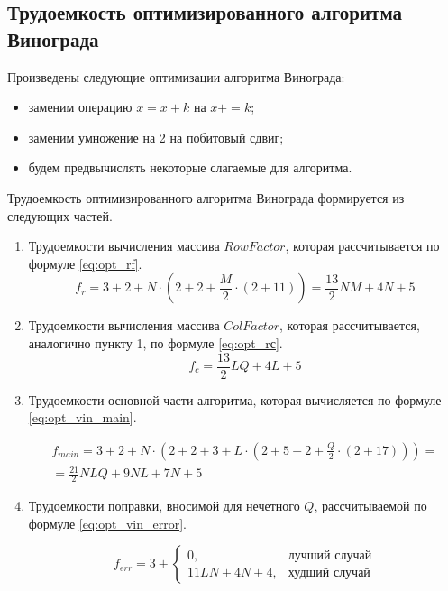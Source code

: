 \subsection{Трудоемкость оптимизированного алгоритма Винограда}

Произведены следующие оптимизации алгоритма Винограда:
\begin{itemize}
	\item заменим операцию $x = x + k$ на $x += k$;
	\item заменим умножение на 2 на побитовый сдвиг;
	\item будем предвычислять некоторые слагаемые для алгоритма.
\end{itemize}

Трудоемкость оптимизированного алгоритма Винограда формируется из следующих частей.
\begin{enumerate}
	\item Трудоемкости вычисления массива $RowFactor$, которая рассчитывается по формуле \eqref{eq:opt_rf}.
	\begin{equation}
		\label{eq:opt_rf}
		f_{r} = 3 + 2 + N \cdot (2 + 2 + \frac{M}{2} \cdot (2 + 11)) = \frac{13}{2}NM + 4N + 5
	\end{equation}
	
	\item Трудоемкости вычисления массива $ColFactor$, которая рассчитывается, аналогично пункту 1, по формуле \eqref{eq:opt_rс}.
	\begin{equation}
		\label{eq:opt_rс}
		f_{c} = \frac{13}{2}LQ + 4L + 5
	\end{equation}
	
	\item Трудоемкости основной части алгоритма, которая вычисляется по формуле \eqref{eq:opt_vin_main}.
	
	\begin{equation}
		\label{eq:opt_vin_main}
		\begin{gathered}
			f_{main} = 3 + 2 + N \cdot (2 + 2 + 3 + L \cdot (2 + 5 + 2 + \frac{Q}{2} \cdot (2 + 17))) = \\
			= \frac{21}{2} NLQ + 9NL + 7N + 5
		\end{gathered}
	\end{equation}
	
	\item Трудоемкости поправки, вносимой для нечетного $Q$, рассчитываемой по формуле \eqref{eq:opt_vin_error}.
	
	\begin{equation}
		\label{eq:opt_vin_error}
		f_{err} = 3 +
		\begin{cases}
			0, & \text{лучший случай}\\
			11LN + 4N + 4, & \text{худший случай}
		\end{cases}
	\end{equation}
	
\end{enumerate}


